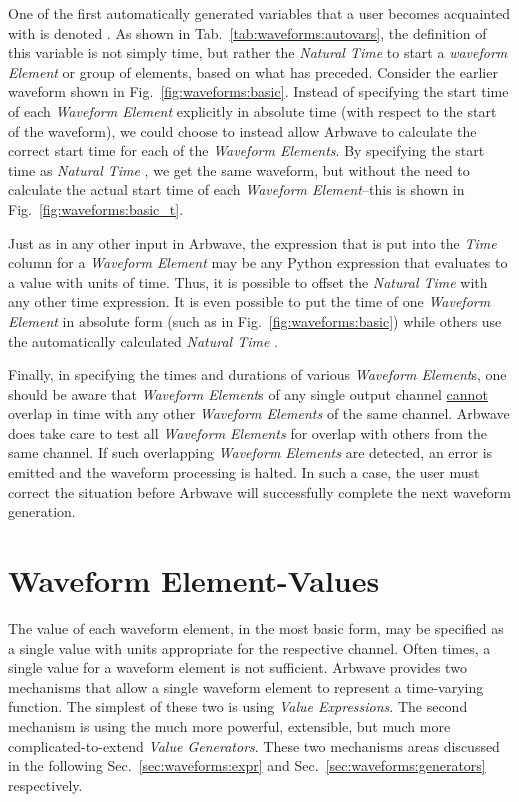 One of the first automatically generated variables that a user becomes
acquainted with is denoted .  As shown in
Tab.~\ref{tab:waveforms:autovars}, the definition of this variable is not simply
time, but rather the \textit{Natural Time} to start a \textit{waveform Element}
or group of elements, based on what has preceded.  Consider the earlier waveform
shown in Fig.~\ref{fig:waveforms:basic}.  Instead of specifying the start time
of each \textit{Waveform Element} explicitly in absolute time (with respect to
the start of the waveform), we could choose to instead allow Arbwave to
calculate the correct start time for each of the \textit{Waveform Elements}.  By
specifying the start time as \textit{Natural Time} , we get
the same waveform, but without the need to calculate the actual start time of
each \textit{Waveform Element}--this is shown in
Fig.~\ref{fig:waveforms:basic_t}.

Just as in any other input in Arbwave, the expression that is put into
the \textit{Time} column for a \textit{Waveform Element} may be any Python
expression that evaluates to a value with units of time.  Thus, it is possible
to offset the \textit{Natural Time}  with any other time
expression.  It is even possible to put the time of one \textit{Waveform Element} in absolute
form (such as in Fig.~\ref{fig:waveforms:basic}) while others use the
automatically calculated \textit{Natural Time} .

Finally, in specifying the times and durations of various \textit{Waveform
Element}s, one should be aware that \textit{Waveform Element}s of any single
output channel \underline{cannot} overlap in time with any other
\textit{Waveform Elements} of the same channel.  Arbwave does take care to test
all \textit{Waveform Elements} for overlap with others from the same channel.
If such overlapping \textit{Waveform Elements} are detected, an error is emitted
and the waveform processing is halted.  In such a case, the user must correct
the situation before Arbwave will successfully complete the next waveform
generation.



\section{Waveform Element-Values}\label{sec:waveforms:value}

The value of each waveform element, in the most basic form, may be specified as
a single value with units appropriate for the respective channel.
%
Often times, a single value for a waveform element is not sufficient.  Arbwave
provides two mechanisms that allow a single waveform element to represent a
time-varying function.  The simplest of these two is using \textit{Value
Expressions}.  The second mechanism is using the much more powerful, extensible,
but much more complicated-to-extend \textit{Value Generators}.  These two
mechanisms areas discussed in the following Sec.~\ref{sec:waveforms:expr} and
Sec.~\ref{sec:waveforms:generators} respectively.


